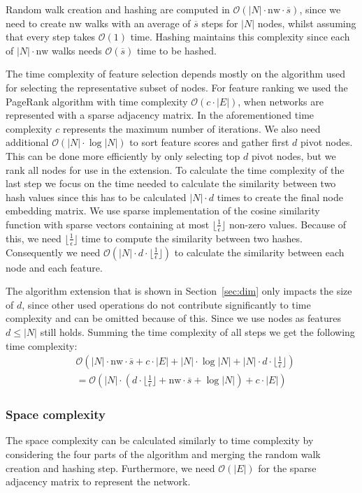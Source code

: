 \documentclass[twoside,11pt]{article}
\begin{document}
Random walk creation and hashing are computed in $\mathcal{O}(|N|\cdot\textrm{nw}\cdot\overline{s})$, since we need to create $\textrm{nw}$ walks with an average of $\overline{s}$ steps for $|N|$ nodes, whilst assuming that every step takes $\mathcal{O}(1)$ time. Hashing maintains this complexity since each of $|N|\cdot\textrm{nw}$ walks needs $\mathcal{O}(\overline{s})$ time to be hashed.

The time complexity of feature selection depends mostly on the algorithm used for selecting the representative subset of nodes. For feature ranking we used the PageRank algorithm with time complexity $\mathcal{O}(c\cdot |E|)$, when networks are represented with a sparse adjacency matrix. In the aforementioned time complexity $c$ represents the maximum number of iterations. We also need additional $\mathcal{O}(|N|\cdot\log|N|)$ to sort feature scores and gather first $d$ pivot nodes. This can be done more efficiently by only selecting top $d$ pivot nodes, but we rank all nodes for use in the extension. To calculate the time complexity of the last step we focus on the time needed to calculate the similarity between two hash values since this has to be calculated $|N|\cdot d$ times to create the final node embedding matrix. We use sparse implementation of the cosine similarity function with sparse vectors containing at most $\lfloor\frac{1}{\epsilon}\rfloor$ non-zero values. Because of this, we need $\lfloor\frac{1}{\epsilon}\rfloor$ time to compute the similarity between two hashes. Consequently we need $\mathcal{O}(|N| \cdot d \cdot \lfloor\frac{1}{\epsilon}\rfloor)$ to calculate the similarity between each node and each feature.

The algorithm extension that is shown in Section~\ref{sec:dim} only impacts the size of $d$, since other used operations do not contribute significantly to time complexity and can be omitted because of this. Since we use nodes as features $d \leq |N|$ still holds.
Summing the time complexity of all steps we get the following time complexity:
\begin{align*}
&\mathcal{O}(|N|\cdot \textrm{nw}\cdot \overline{s} + c\cdot |E| + |N|\cdot \log|N| + |N|\cdot d \cdot \lfloor\frac{1}{\epsilon}\rfloor) \\&= \mathcal{O}(|N|\cdot (d\cdot \lfloor\frac{1}{\epsilon}\rfloor + \textrm{nw}\cdot \overline{s} + \log|N|) + c\cdot |E|)
\end{align*}

\subsubsection{Space complexity}
The space complexity can be calculated similarly to time complexity by considering the four parts of the algorithm and merging the random walk creation and hashing step. Furthermore, we need $\mathcal{O}(|E|)$ for the sparse adjacency matrix to represent the network. 
\end{document}
